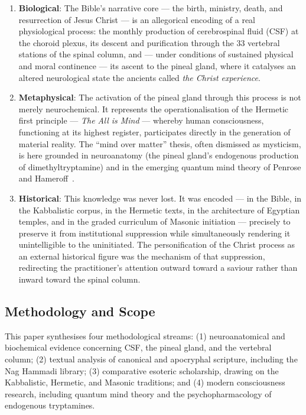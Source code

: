 \documentclass[12pt, a4paper]{article}
\begin{document}
\begin{enumerate}[label=\textbf{\arabic*.}]
  \item \textbf{Biological}: The Bible's narrative core — the birth, ministry,
  death, and resurrection of Jesus Christ — is an allegorical encoding of a
  real physiological process: the monthly production of cerebrospinal fluid
  (CSF) at the choroid plexus, its descent and purification through the 33
  vertebral stations of the spinal column, and — under conditions of
  sustained physical and moral continence — its ascent to the pineal gland,
  where it catalyses an altered neurological state the ancients called
  \emph{the Christ experience}.

  \item \textbf{Metaphysical}: The activation of the pineal gland through this
  process is not merely neurochemical. It represents the operationalisation of
  the Hermetic first principle — \emph{The All is Mind} — whereby human
  consciousness, functioning at its highest register, participates directly in
  the generation of material reality. The ``mind over matter'' thesis, often
  dismissed as mysticism, is here grounded in neuroanatomy (the pineal gland's
  endogenous production of dimethyltryptamine) and in the emerging quantum
  mind theory of Penrose and Hameroff~\autocite{hameroff2014}.

  \item \textbf{Historical}: This knowledge was never lost. It was encoded —
  in the Bible, in the Kabbalistic corpus, in the Hermetic texts, in the
  architecture of Egyptian temples, and in the graded curriculum of Masonic
  initiation — precisely to preserve it from institutional suppression while
  simultaneously rendering it unintelligible to the uninitiated. The
  personification of the Christ process as an external historical figure was
  the mechanism of that suppression, redirecting the practitioner's attention
  outward toward a saviour rather than inward toward the spinal column.
\end{enumerate}

\subsection{Methodology and Scope}

This paper synthesises four methodological streams: (1) neuroanatomical and
biochemical evidence concerning CSF, the pineal gland, and the vertebral
column; (2) textual analysis of canonical and apocryphal scripture, including
the Nag Hammadi library; (3) comparative esoteric scholarship, drawing on the
Kabbalistic, Hermetic, and Masonic traditions; and (4) modern consciousness
research, including quantum mind theory and the psychopharmacology of
endogenous tryptamines.
\end{document}
